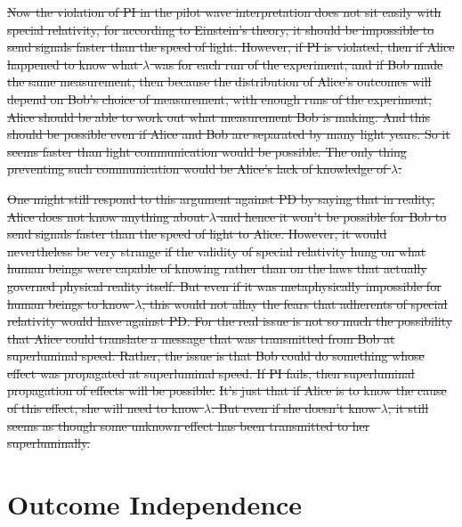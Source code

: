\documentclass[12pt]{report}
\providecommand{\DIFdel}[1]{{\protect\color{red}\sout{#1}}}                      %
\providecommand{\DIFdelbegin}{} %
\providecommand{\DIFdelend}{} %
\begin{document}
  





\DIFdelbegin \DIFdel{Now the violation of PI in the pilot wave interpretation does not sit easily with special relativity, for according to Einstein's theory, it should be impossible to send signals faster than the speed of light. However, if PI is violated, then if Alice happened to know what $\lambda$ was for each run of the experiment, and if Bob made the same measurement, then because the distribution of Alice's outcomes will depend on Bob's choice of measurement, with enough runs of the experiment, Alice should be able to work out what measurement Bob is making. And this should be possible even if Alice and Bob are separated by many light years. So it seems faster than light communication would be possible. The only thing preventing such communication would be Alice's lack of knowledge of $\lambda$. 
}%

\DIFdel{One might still respond to this argument against PD by saying that in reality, Alice does not know anything about $\lambda$ and hence it won't be possible for Bob to send signals faster than the speed of light to Alice. However, it would nevertheless be very strange if the validity of special relativity hung on what human beings were capable of knowing rather than on the laws that actually governed physical reality itself. But even if it was metaphysically impossible for human beings to know $\lambda$, this would not allay the fears that adherents of special relativity would have against PD. For the real issue is not so much the possibility that Alice could translate a message that was transmitted from Bob at superluminal speed. Rather, the issue is that Bob could do something whose effect was propagated at superluminal speed. If PI fails, then superluminal propagation of effects will be possible.}%
\DIFdel{It's just that if Alice is to know the cause of this effect, she will need to know $\lambda$. But even if she doesn't know $\lambda$, it still seems as though some unknown effect has been transmitted to her superluminally.   
}%

\DIFdelend %

\section{Outcome Independence\label{OISec}}
\end{document}
